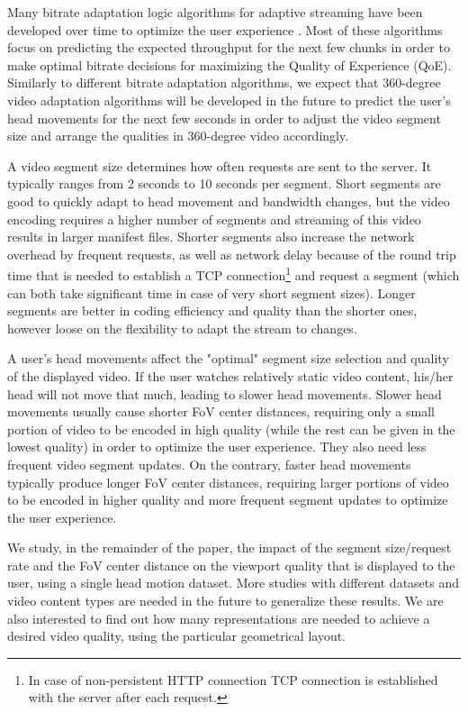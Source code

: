 Many bitrate adaptation logic algorithms for adaptive streaming have been developed over time to optimize the user experience \cite{}. Most of these algorithms focus on predicting the expected throughput for the next few chunks in order to make optimal bitrate decisions for maximizing the Quality of Experience (QoE). Similarly to different bitrate adaptation algorithms, we expect that 360-degree video adaptation algorithms will be developed in the future to predict the user's head movements for the next few seconds in order to adjust the video segment size and arrange the qualities in 360-degree video accordingly. %

A video segment size determines how often requests are sent to the server. It typically ranges from 2 seconds to 10 seconds per segment. Short segments are good to quickly adapt to head movement and bandwidth changes, but the video encoding requires a higher number of segments and streaming of this video results in larger manifest files. Shorter segments also increase the network overhead by frequent requests, as well as network delay because of the round trip time that is needed to establish a TCP connection\footnote{In case of non-persistent HTTP connection TCP connection is established with the server after each request.} and request a segment (which can both take significant time in case of very short segment sizes). Longer segments are better in coding efficiency and quality than the shorter ones, however loose on the flexibility to adapt the stream to changes.

A user's head movements affect the "optimal" segment size selection and quality of the displayed video. If the user watches relatively static video content, his/her head will not move that much, leading to slower head movements. Slower head movements usually cause shorter FoV center distances, requiring only a small portion of video to be encoded in high quality (while the rest can be given in the lowest quality) in order to optimize the user experience. They also need less frequent video segment updates. On the contrary, faster head movements typically produce longer FoV center distances,  requiring larger portions of video to be encoded in higher quality and more frequent segment updates to optimize the user experience. 

We study, in the remainder of the paper, the impact of the segment size/request rate and the FoV center distance on the viewport quality that is displayed to the user, using a single head motion dataset. More studies with different datasets and video content types are needed in the future to generalize these results. We are also interested to find out how many representations are needed to achieve a desired video quality, using the particular geometrical layout.
